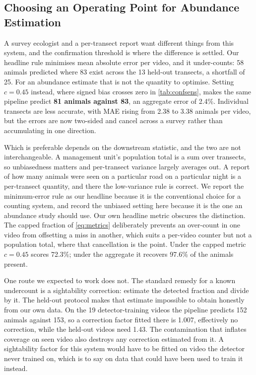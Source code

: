 \subsection{Choosing an Operating Point for Abundance Estimation}
\label{sec:operating}

A survey ecologist and a per-transect report want different things from this system, and
the confirmation threshold is where the difference is settled. Our headline rule minimises
mean absolute error per video, and it under-counts: 58 animals predicted where 83 exist
across the 13 held-out transects, a shortfall of 25. For an abundance estimate that is not
the quantity to optimise. Setting $c=0.45$ instead, where signed bias crosses zero in
\cref{tab:confsens}, makes the same pipeline predict \textbf{81 animals against 83}, an
aggregate error of 2.4\%. Individual transects are less accurate, with MAE rising from 2.38
to 3.38 animals per video, but the errors are now two-sided and cancel across a survey
rather than accumulating in one direction.

Which is preferable depends on the downstream statistic, and the two are not
interchangeable. A management unit's population total is a sum over transects, so
unbiasedness matters and per-transect variance largely averages out. A report of how many
animals were seen on a particular road on a particular night is a per-transect quantity,
and there the low-variance rule is correct. We report the minimum-error rule as our
headline because it is the conventional choice for a counting system, and record the
unbiased setting here because it is the one an abundance study should use. Our own headline
metric obscures the distinction. The capped fraction of \cref{eq:metrics} deliberately
prevents an over-count in one video from offsetting a miss in another, which suits a
per-video counter but not a population total, where that cancellation is the point. Under
the capped metric $c=0.45$ scores 72.3\%; under the aggregate it recovers 97.6\% of the
animals present.

One route we expected to work does not. The standard remedy for a known undercount is a
sightability correction: estimate the detected fraction and divide by it. The held-out
protocol makes that estimate impossible to obtain honestly from our own data. On the 19
detector-training videos the pipeline predicts 152 animals against 153, so a correction
factor fitted there is 1.007, effectively no correction, while the held-out videos need
1.43. The contamination that inflates coverage on seen video also destroys any correction
estimated from it. A sightability factor for this system would have to be fitted on video
the detector never trained on, which is to say on data that could have been used to train
it instead.

